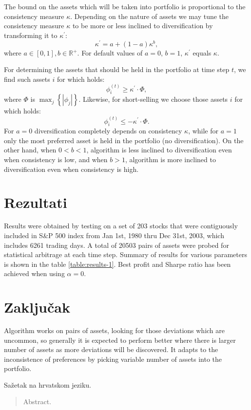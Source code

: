 \documentclass[lmodern, utf8, diplomski, numeric]{fer}
\begin{document}
  The bound on the assets which will be taken into portfolio is proportional to the consistency measure $\kappa$.
  Depending on the nature of assets we may tune the consistency measure $\kappa$ to be more or less inclined to diversification by transforming it to $\kappa^\prime$:
  \begin{equation}
  \kappa^\prime = a + (1 - a)\kappa^b,
  \end{equation}
  where $a \in [0, 1], b \in \mathbb{R}^+$.
  For default values of $a = 0$, $b = 1$, $\kappa^\prime$ equals $\kappa$.
  
  For determining the assets that should be held in the portfolio at time step $t$, we find such assets $i$ for which holds:
  \begin{equation}
  \phi_i^{(t)} \ge \kappa^\prime \cdot \Phi,
  \end{equation}
  where $\Phi$ is $\max_j \left\{ \left| \phi_j \right| \right\}$.
  Likewise, for short-selling we choose those assets $i$ for which holds:
  \begin{equation}
  \phi_i^{(t)} \le -\kappa^\prime \cdot \Phi.
  \end{equation}
  For $a = 0$ diversification completely depends on consistency $\kappa$, while for $a = 1$ only the most preferred asset is held in the portfolio (no diversification).
  On the other hand, when $0 < b < 1$, algorithm is less inclined to diversification even when consistency is low, and when $b > 1$, algorithm is more inclined to diversification even when consistency is high. 
  
  \chapter{Rezultati}
  
  Results were obtained by testing on a set of 203 stocks that were contiguously included in S\&P 500 index from Jan 1st, 1980 thru Dec 31st, 2003, which includes 6261 trading days.
  A total of 20503 pairs of assets were probed for statistical arbitrage at each time step.
  Summary of results for various parameters is shown in the table \ref{table:results-1}.
  Best profit and Sharpe ratio has been achieved when using $\alpha = 0$.
  
  

  \chapter{Zaključak}
  Algorithm works on pairs of assets, looking for those deviations which are uncommon, so generally it is expected to perform better where there is larger number of assets as more deviations will be discovered.
  It adapts to the inconsistence of preferences by picking variable number of assets into the portfolio.




\begin{sazetak}
Sažetak na hrvatskom jeziku.

\end{sazetak}

\begin{abstract}
Abstract.

\end{abstract}
\end{document}
